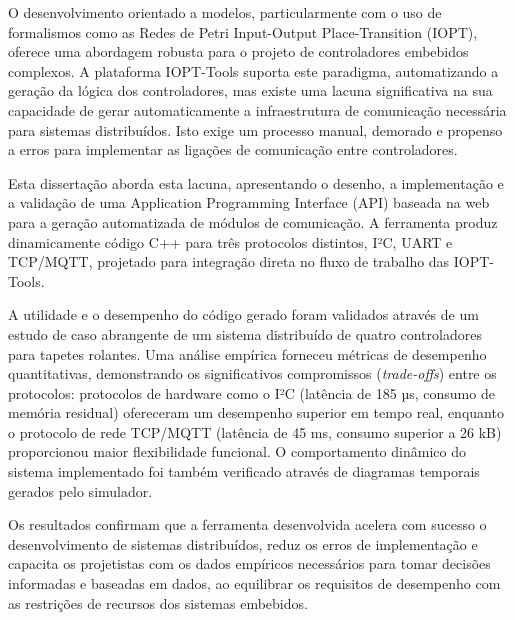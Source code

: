
%


O desenvolvimento orientado a modelos, particularmente com o uso de formalismos como as Redes de Petri Input-Output Place-Transition (IOPT), oferece uma abordagem robusta para o projeto de controladores embebidos complexos. A plataforma IOPT-Tools suporta este paradigma, automatizando a geração da lógica dos controladores, mas existe uma lacuna significativa na sua capacidade de gerar automaticamente a infraestrutura de comunicação necessária para sistemas distribuídos. Isto exige um processo manual, demorado e propenso a erros para implementar as ligações de comunicação entre controladores.

Esta dissertação aborda esta lacuna, apresentando o desenho, a implementação e a validação de uma Application Programming Interface (API) baseada na web para a geração automatizada de módulos de comunicação. A ferramenta produz dinamicamente código C++ para três protocolos distintos, I²C, UART e TCP/MQTT,  projetado para integração direta no fluxo de trabalho das IOPT-Tools.

A utilidade e o desempenho do código gerado foram validados através de um estudo de caso abrangente de um sistema distribuído de quatro controladores para tapetes rolantes. Uma análise empírica forneceu métricas de desempenho quantitativas, demonstrando os significativos compromissos (\textit{trade-offs}) entre os protocolos: protocolos de hardware como o I²C (latência de 185 µs, consumo de memória residual) ofereceram um desempenho superior em tempo real, enquanto o protocolo de rede TCP/MQTT (latência de 45 ms, consumo superior a 26 kB) proporcionou maior flexibilidade funcional. O comportamento dinâmico do sistema implementado foi também verificado através de diagramas temporais gerados pelo simulador.

Os resultados confirmam que a ferramenta desenvolvida acelera com sucesso o desenvolvimento de sistemas distribuídos, reduz os erros de implementação e capacita os projetistas com os dados empíricos necessários para tomar decisões informadas e baseadas em dados, ao equilibrar os requisitos de desempenho com as restrições de recursos dos sistemas embebidos.
